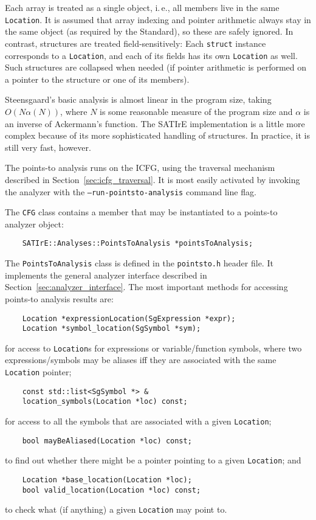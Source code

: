 \documentclass[a4paper,12pt]{report}
\begin{document}
Each array is treated as a single object, i.\,e., all members live in the
same \texttt{Location}. It is assumed that array indexing and pointer
arithmetic always stay in the same object (as required by the Standard), so
these are safely ignored. In contrast, structures are treated
field-sensitively: Each \texttt{struct} instance corresponds to a
\texttt{Location}, and each of its fields has its own \texttt{Location} as
well. Such structures are collapsed when needed (if pointer arithmetic is
performed on a pointer to the structure or one of its members).

Steensgaard's basic analysis is almost linear in the program size, taking
\(O(N \alpha(N))\), where \(N\) is some reasonable measure of the program
size and \(\alpha\) is an inverse of Ackermann's function. The SATIrE
implementation is a little more complex because of its more sophisticated
handling of structures. In practice, it is still very fast, however.

The points-to analysis runs on the ICFG, using the traversal mechanism
described in Section~\ref{sec:icfg_traversal}. It is most easily activated
by invoking the analyzer with the \texttt{--run-pointsto-analysis} command
line flag.

The \texttt{CFG} class contains a member that may be instantiated to a
points-to analyzer object:
\begin{verbatim}
    SATIrE::Analyses::PointsToAnalysis *pointsToAnalysis;
\end{verbatim}

The \texttt{PointsToAnalysis} class is defined in the \verb|pointsto.h|
header file. It implements the general analyzer interface described in
Section~\ref{sec:analyzer_interface}. The most important methods for
accessing points-to analysis results are:
\begin{verbatim}
    Location *expressionLocation(SgExpression *expr);
    Location *symbol_location(SgSymbol *sym);
\end{verbatim}
for access to \texttt{Location}s for expressions or variable/function
symbols, where two expressions/symbols may be aliases iff they are
associated with the same \texttt{Location} pointer;
\begin{verbatim}
    const std::list<SgSymbol *> &
    location_symbols(Location *loc) const;
\end{verbatim}
for access to all the symbols that are associated with a given
\texttt{Location};
\begin{verbatim}
    bool mayBeAliased(Location *loc) const;
\end{verbatim}
to find out whether there might be a pointer pointing to a given
\texttt{Location}; and
\begin{verbatim}
    Location *base_location(Location *loc);
    bool valid_location(Location *loc) const;
\end{verbatim}
to check what (if anything) a given \texttt{Location} may point to.
\end{document}
